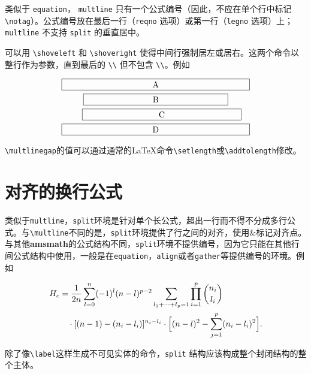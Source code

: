 \documentclass[openany]{ctexbook}
\begin{document}
类似于 \verb|equation|， \verb|multline| 只有一个公式编号（因此，不应在单个行中标记 \verb|\notag|）。公式编号放在最后一行（\verb|reqno| 选项）或第一行（\verb|legno| 选项）上；\verb|multline| 不支持 \verb|split| 的垂直居中。

可以用 \verb|\shoveleft| 和 \verb|\shoveright| 使得中间行强制居左或居右。这两个命令以整行作为参数，直到最后的 \verb|\\| 但不包含 \verb|\\|。例如
\begin{tcblisting}{}
\begin{multline}
\framebox[.65\columnwidth]{A}\\
\framebox[.5\columnwidth]{B}\\
\shoveright{\framebox[.55\columnwidth]{C}}\\
\framebox[.65\columnwidth]{D}
\end{multline}
\end{tcblisting}

\verb|\multlinegap|的值可以通过通常的\LaTeX 命令\verb|\setlength|或\verb|\addtolength|修改。

\section{对齐的换行公式}
类似于\verb|multline|，\verb|split|环境是针对单个长公式，超出一行而不得不分成多行公式。与\verb|\multline|不同的是，\verb|split|环境提供了行之间的对齐，使用\&标记对齐点。与其他{\bfseries amsmath}的公式结构不同，\verb|split|环境不提供编号，因为它只能在其他行间公式结构中使用，一般是在\verb|equation|，\verb|align|或者\verb|gather|等提供编号的环境。例如
\begin{tcblisting}{}
\begin{equation}\label{e:barwq}\begin{split}
H_c&=\frac{1}{2n} \sum^n_{l=0}(-1)^{l}(n-{l})^{p-2}
  \sum_{l _1+\dots+l _p=1}\prod^p_{i=1} \binom{n_i}{l _i}\\
  &\quad\cdot[(n-1 )-(n_i-l _i)]^{n_i-l _i}\cdot
   \Bigl[(n-l )^2-\sum^p_{j=1}(n_i-l _i)^2\Bigr].
\end{split}\end{equation}
\end{tcblisting}
  
  
除了像\verb|\label|这样生成不可见实体的命令，\verb|split| 结构应该构成整个封闭结构的整个主体。
\end{document}
